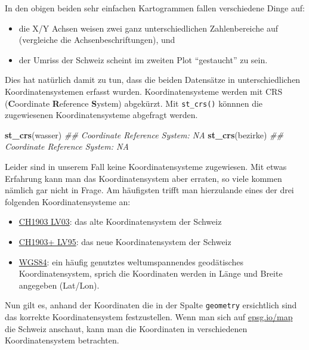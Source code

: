 \documentclass[]{book}
\newenvironment{Shaded}{\begin{snugshade}}{\end{snugshade}}
\newcommand{\CommentTok}[1]{\textcolor[rgb]{0.56,0.35,0.01}{\textit{#1}}}
\newcommand{\KeywordTok}[1]{\textcolor[rgb]{0.13,0.29,0.53}{\textbf{#1}}}
\newcommand{\NormalTok}[1]{#1}
\providecommand{\tightlist}{%
  \setlength{\itemsep}{0pt}\setlength{\parskip}{0pt}}
\begin{document}
In den obigen beiden sehr einfachen Kartogrammen fallen verschiedene Dinge auf:

\begin{itemize}
\tightlist
\item
  die X/Y Achsen weisen zwei ganz unterschiedlichen Zahlenbereiche auf (vergleiche die Achsenbeschriftungen), und
\item
  der Umriss der Schweiz scheint im zweiten Plot ``gestaucht'' zu sein.
\end{itemize}

Dies hat natürlich damit zu tun, dass die beiden Datensätze in unterschiedlichen Koordinatensystemen erfasst wurden. Koordinatensysteme werden mit CRS (\textbf{C}oordinate \textbf{R}eference \textbf{S}ystem) abgekürzt. Mit \texttt{st\_crs()} könnnen die zugewiesenen Koordinatensysteme abgefragt werden.

\begin{Shaded}
\begin{Highlighting}[]
\KeywordTok{st_crs}\NormalTok{(wasser)}
\CommentTok{## Coordinate Reference System: NA}
\KeywordTok{st_crs}\NormalTok{(bezirke)}
\CommentTok{## Coordinate Reference System: NA}
\end{Highlighting}
\end{Shaded}

Leider sind in unserem Fall keine Koordinatensysteme zugewiesen. Mit etwas Erfahrung kann man das Koordinatensystem aber erraten, so viele kommen nämlich gar nicht in Frage. Am häufigsten trifft man hierzulande eines der drei folgenden Koordinatensysteme an:

\begin{itemize}
\tightlist
\item
  \href{https://epsg.io/21781}{CH1903 LV03}: das alte Koordinatensystem der Schweiz
\item
  \href{https://epsg.io/2056}{CH1903+ LV95}: das neue Koordinatensystem der Schweiz
\item
  \href{https://epsg.io/4326}{WGS84}: ein häufig genutztes weltumspannendes geodätisches Koordinatensystem, sprich die Koordinaten werden in Länge und Breite angegeben (Lat/Lon).
\end{itemize}

Nun gilt es, anhand der Koordinaten die in der Spalte \texttt{geometry} ersichtlich sind das korrekte Koordinatensystem festzustellen. Wenn man sich auf \href{https://epsg.io/map\#srs=4326\&x=8.407288\&y=46.773731\&z=9\&layer=streets}{epsg.io/map} die Schweiz anschaut, kann man die Koordinaten in verschiedenen Koordinatensystem betrachten.
\end{document}
